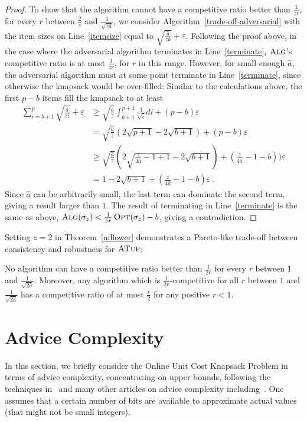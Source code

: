 \documentclass[a4paper,UKenglish,cleveref, autoref, thm-restate]{lipics-v2021}
\newcommand{\ALG}{\ensuremath{\operatorname{\textsc{Alg}}}\xspace}
\newcommand{\OPT}{\ensuremath{\operatorname{\textsc{Opt}}}\xspace}
\newcommand{\MLB}{\ensuremath{\operatorname{\textsc{ATup}}}\xspace}
\newcommand{\eps}{\ensuremath{\varepsilon}}
\newcommand{\guess}{\ensuremath{\hat{a}}\xspace}
\begin{document}
\begin{proof}
To show that the algorithm cannot
have a competitive ratio better than $\frac{1}{zr}$, for every $r$ between
$\frac{2}{z}$ and $\frac{1}{\sqrt{z\guess}}$, we consider
Algorithm~\ref{trade-off-adversarial} with the item sizes on
Line~\ref{itemsize} equal to $\sqrt{\frac{\guess}{zk}}+\eps$. Following the
proof above,
in the case where the adversarial algorithm terminates in Line~\ref{terminate},
$\ALG$'s competitive ratio is at most $\frac{1}{zr}$, for $r$ in this
range. However, for small enough $\guess$, the adversarial algorithm must at
some point terminate in
Line~\ref{terminate}, since otherwise the knapsack would be over-filled:
Similar to the calculations above, 
the first $p-b$ items fill the knapsack to at least
\begin{align*}
\sum_{i=b+1}^{p} \sqrt{\frac{\guess}{zi}}+\eps
& \geq \sqrt{\frac{\guess}{z}}\int_{b+1}^{p+1} \frac{1}{\sqrt{i}}di +(p-b)\eps \\
& = \sqrt{\frac{\guess}{z}} \left(2\sqrt{p+1}-2\sqrt{b+1}\right) +(p-b)\eps \\
& \geq  \sqrt{\frac{\guess}{z}} \left(2\sqrt{\frac{z}{4\guess}-1+1}-2\sqrt{b+1}\right) +\left(\frac{z}{4\guess}-1-b\right))\eps \\
& = 1-2\sqrt{b+1} +\left(\frac{z}{4\guess}-1-b\right)\eps\,.
\end{align*}
Since $\guess$ can be arbitrarily small, the last term can dominate
the second term, giving a result larger than $1$. The result of
terminating in Line~\ref{terminate} is the same as above,
$\ALG(\sigma_z)< \frac{1}{zr}\OPT(\sigma_z)-b$, giving a
contradiction.
\end{proof}

Setting $z=2$ in Theorem~\ref{mllower} demonstrates a Pareto-like
trade-off between consistency and robustness for \MLB:

\begin{corollary}
  No algorithm can have a competitive ratio better than $\frac{1}{2r}$
  for every $r$ between $1$ and $\frac{1}{\sqrt{2\guess}}$.
  Moreover, any algorithm which is $\frac{1}{2r}$-competitive for all
  $r$ between $1$ and $\frac{1}{\sqrt{2 \guess}}$ has a competitive
  ratio of at most $\frac{r}{2}$ for any positive $r<1$.
\end{corollary}


\section{Advice Complexity}
\label{numberofbits}
In this section, we briefly consider the Online Unit Cost Knapsack Problem
in terms of advice complexity, concentrating on upper bounds,
following the techniques in~\cite{BKKR14} and many other articles on
advice complexity including~\cite{ADKRR18,CFL15}.
One assumes that a certain number of bits are
available to approximate actual values (that might not be small integers).
\end{document}
